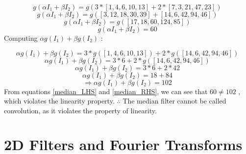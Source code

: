 \documentclass[a4paper,11pt]{article}
\begin{document}
\[ 
    g(\alpha I_1 + \beta I_2) = g( 3*[1,4,6,10,13] + 2*[7,3,21,47,23])
\]
\[ 
    g(\alpha I_1 + \beta I_2) = g([3,12,18,30,39] + [14,6,42,94,46])
\]
\[ 
    g(\alpha I_1 + \beta I_2) = g([17,18,60,124,85])
\]
\begin{equation}
\label{median_LHS}
    g(\alpha I_1 + \beta I_2) = 60
\end{equation}
\newline
Computing $ \alpha g(I_1) + \beta g(I_2)$ :

\[
\alpha g(I_1) + \beta g(I_2) = 3 * g([1,4,6,10,13]) + 2*g([14,6,42,94,46])
\]
\[
\alpha g(I_1) + \beta g(I_2) = 3 * 6 + 2*g([14,6,42,94,46])
\]
\[
\alpha g(I_1) + \beta g(I_2) = 3 * 6 + 2*42
\]
\[
\alpha g(I_1) + \beta g(I_2) = 18 + 84
\]
\begin{equation}
\label{median_RHS}
\Rightarrow \alpha g(I_1) + \beta g(I_2) = 102
\end{equation}
\newline
From equations \ref{median_LHS} and \ref{median_RHS}, we can see that $60 \ne 102$ , which violates the linearity property.
\newline
$\therefore$ The median filter cannot be called convolution, as it violates the property of linearity.

\section{2D Filters and Fourier Transforms}
\end{document}
